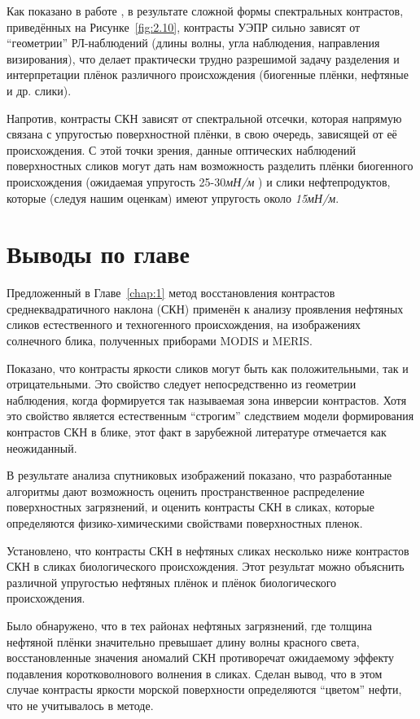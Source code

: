 Как показано в работе \citep{2008}, в результате сложной формы спектральных контрастов, приведённых на Рисунке~\ref{fig:2.10}, контрасты УЭПР сильно зависят от ``геометрии'' РЛ-наблюдений (длины волны, угла наблюдения, направления визирования), что делает практически трудно разрешимой задачу разделения и интерпретации плёнок различного происхождения (биогенные плёнки, нефтяные и др. слики).

Напротив, контрасты СКН зависят от спектральной отсечки, которая напрямую связана с упругостью поверхностной плёнки, в свою очередь, зависящей от её происхождения. С этой точки зрения, данные оптических наблюдений поверхностных сликов могут дать нам возможность разделить плёнки биогенного происхождения (ожидаемая упругость 25-30\textit{мН/м }) и слики нефтепродуктов, которые (следуя нашим оценкам) имеют упругость около \textit{15мН/м}.



\newpage



\section{Выводы по главе}


Предложенный в Главе~\ref{chap:1} метод восстановления контрастов среднеквадратичного наклона (СКН) применён к анализу проявления нефтяных сликов естественного и техногенного происхождения, на изображениях солнечного блика, полученных приборами MODIS и MERIS.

Показано, что контрасты яркости сликов могут быть как положительными, так и отрицательными. Это свойство следует непосредственно из геометрии наблюдения, когда формируется так называемая зона инверсии контрастов. Хотя это свойство является естественным ``строгим'' следствием модели формирования контрастов СКН в блике, этот факт в зарубежной литературе отмечается как неожиданный.

В результате анализа спутниковых изображений показано, что разработанные алгоритмы дают возможность оценить пространственное распределение поверхностных загрязнений, и оценить контрасты СКН в сликах, которые определяются физико-химическими свойствами поверхностных пленок.

Установлено, что контрасты СКН в нефтяных сликах несколько ниже контрастов СКН в сликах биологического происхождения. Этот результат можно объяснить различной упругостью нефтяных плёнок и плёнок биологического происхождения.

Было обнаружено, что в тех районах нефтяных загрязнений, где толщина нефтяной плёнки значительно превышает длину волны красного света, восстановленные значения аномалий СКН противоречат ожидаемому эффекту подавления коротковолнового волнения в сликах. Сделан вывод, что в этом случае контрасты яркости морской поверхности определяются ``цветом'' нефти, что не учитывалось в методе.

